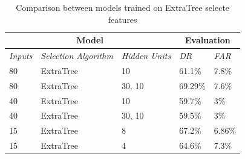 \begin{table}[h]
\center
\begin{tabular}{|l|l|l||l|l|}
\hline
\multicolumn{3}{|c||}{\textbf{Model}}                                   & \multicolumn{2}{c|}{\textbf{Evaluation}} \\ \hline
\textit{Inputs} & \textit{Selection Algorithm} & \textit{Hidden Units} & \textit{DR}    & \textit{FAR}    \\ \hline
80             & ExtraTree                         & 10                    &   61.1\%                  &   7.8\%                 \\ \hline
80             & ExtraTree                         & 30, 10               &   69.29\%                  &    7.6\%                \\ \hline
40             & ExtraTree                         & 10                    &   59.7\%                  &   3\%                 \\ \hline
40             & ExtraTree                         & 30, 10               &   59.5\%                  &     3\%               \\ \hline
15             & ExtraTree                         & 8                &       67.2\%              &   6.86\%                 \\ \hline
15             & ExtraTree                         & 4                &       64.6\%              &   7.3\%                 \\ \hline
\end{tabular}
\caption{Comparison between models trained on ExtraTree selecte features}
\label{tab:treefeat}
\end{table}


